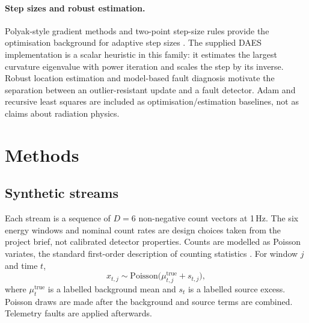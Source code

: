 \documentclass[11pt]{article}
\begin{document}
\paragraph{Step sizes and robust estimation.}
Polyak-style gradient methods and two-point step-size rules provide the optimisation background for adaptive step sizes \citep{barzilai1988two,polyak1963gradient}. The supplied DAES implementation is a scalar heuristic in this family: it estimates the largest curvature eigenvalue with power iteration and scales the step by its inverse. Robust location estimation \citep{huber1964robust} and model-based fault diagnosis \citep{isermann2005model} motivate the separation between an outlier-resistant update and a fault detector. Adam \citep{kingma2015adam} and recursive least squares \citep{ljung1999system} are included as optimisation/estimation baselines, not as claims about radiation physics.

\section{Methods}

\subsection{Synthetic streams}

Each stream is a sequence of $D=6$ non-negative count vectors at 1\,Hz. The six energy windows and nominal count rates are design choices taken from the project brief, not calibrated detector properties. Counts are modelled as Poisson variates, the standard first-order description of counting statistics \citep{knoll2010radiation}. For window $j$ and time $t$,
\begin{equation}
  x_{t,j} \sim \mathrm{Poisson}\bigl(\mu^{\mathrm{true}}_{t,j} + s_{t,j}\bigr),
\end{equation}
where $\mu^{\mathrm{true}}_{t}$ is a labelled background mean and $s_{t}$ is a labelled source excess. Poisson draws are made after the background and source terms are combined. Telemetry faults are applied afterwards.
\end{document}
